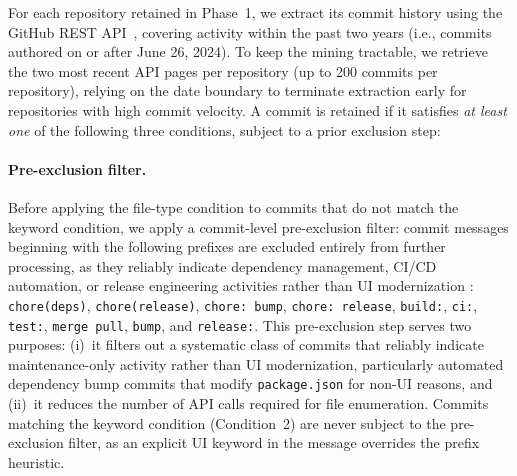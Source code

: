 \documentclass{article}
\begin{document}
For each repository retained in Phase~1, we extract its commit history
using the GitHub REST API~\cite{github2024}, covering activity within the
past two years (i.e., commits authored on or after June 26, 2024). To
keep the mining tractable, we retrieve the two most recent API pages per
repository (up to 200 commits per repository), relying on the date
boundary to terminate extraction early for repositories with high commit
velocity. A commit is retained if it satisfies \emph{at least one} of the
following three conditions, subject to a prior exclusion step:

\paragraph{Pre-exclusion filter.}
Before applying the file-type condition to commits that do not match the
keyword condition, we apply a commit-level pre-exclusion filter: commit
messages beginning with the following prefixes are excluded entirely from
further processing, as they reliably indicate dependency management, CI/CD
automation, or release engineering activities rather than UI modernization
\cite{herzig2013, levin2017}: \texttt{chore(deps)}, \texttt{chore(release)},
\texttt{chore: bump}, \texttt{chore: release}, \texttt{build:}, \texttt{ci:},
\texttt{test:}, \texttt{merge pull}, \texttt{bump}, and \texttt{release:}.
This pre-exclusion step serves two purposes: (i)~it filters out a
systematic class of commits that reliably indicate maintenance-only
activity rather than UI modernization, particularly automated
dependency bump commits that modify \texttt{package.json} for non-UI
reasons, and (ii)~it reduces the number of API calls required for
file enumeration. Commits matching the keyword condition (Condition~2)
are never subject to the pre-exclusion filter, as an explicit UI
keyword in the message overrides the prefix heuristic.
\end{document}
